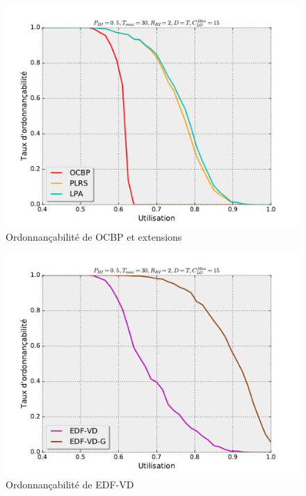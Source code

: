 \documentclass[12pt,a4paper,oneside]{book}
\theoremstyle{break}
\theoremstyle{breakplain}
\begin{document}
\begin{figure}[h]
\includegraphics[width=\textwidth]{./results/perfOCBPetc.pdf}
\caption{Ordonnançabilité de OCBP et extensions}
\end{figure}

\begin{figure}[h]
\includegraphics[width=\textwidth]{./results/perfEDFVD.pdf}
\caption{Ordonnançabilité de EDF-VD}
\end{figure}
\end{document}
